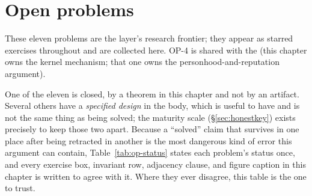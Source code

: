 \documentclass[11pt,a4paper]{article}
\theoremstyle{definition}
\theoremstyle{remark}
\begin{document}

\section{Open problems}
\label{sec:openproblems}

These eleven problems are the layer's research frontier; they appear as
starred exercises throughout and are collected here. OP-4 is shared with the
 (this chapter owns the kernel mechanism; that one owns the
personhood-and-reputation argument).

One of the eleven is closed, by a theorem in this chapter and not by an artifact.
Several others have a \emph{specified design} in the body, which is useful to have
and is not the same thing as being solved; the maturity scale
(\S\ref{sec:honestkey}) exists precisely to keep those two apart. Because a
``solved'' claim that survives in one place after being retracted in another is the
most dangerous kind of error this argument can contain,
Table~\ref{tab:op-status} states each problem's status once, and every exercise
box, invariant row, adjacency clause, and figure caption in this chapter is written
to agree with it. Where they ever disagree, this table is the one to trust.
\end{document}
